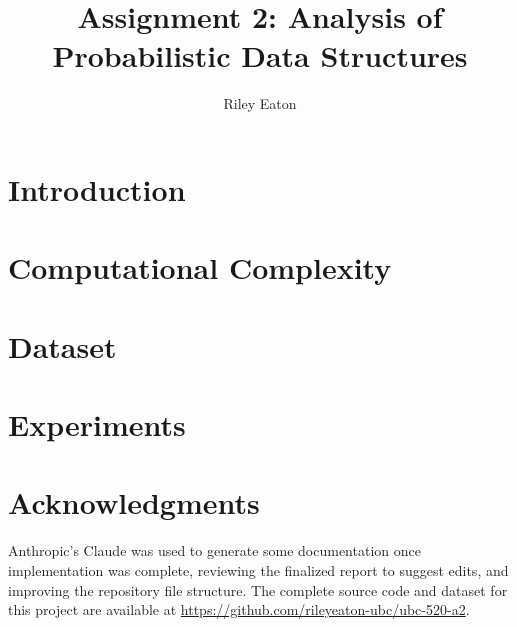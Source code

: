 \documentclass[acmsmall,screen,nonacm]{acmart}
\title{Assignment 2: Analysis of Probabilistic Data Structures}
\author{Riley Eaton}
\affiliation{%
  \institution{University of British Columbia}
  \city{Kelowna}
  \state{BC}
  \country{Canada}
}
\begin{document}
\maketitle

\section{Introduction} \label{sec:introduction}


\section{Computational Complexity} \label{sec:complexity}


\section{Dataset} \label{sec:dataset}


\section{Experiments} \label{sec:experiments}







\section*{Acknowledgments}
Anthropic's Claude was used to generate some documentation once implementation was complete, reviewing the finalized report to suggest edits, and improving the repository file structure. The complete source code and dataset for this project are available at \url{https://github.com/rileyeaton-ubc/ubc-520-a2}.
\end{document}
